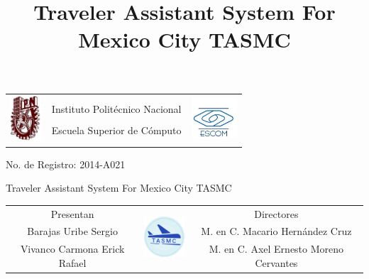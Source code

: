 \documentclass[12pt]{beamer}
\title[TASMC]{Traveler Assistant System For Mexico City TASMC}
\date{}
\begin{document}
\begin{frame}
	\begin{center}
	\begin{minipage}[t]{0.8\textwidth}	
		\begin{tabular}{ccc}
			\multirow{4}{*}{\includegraphics[height=1.7cm]{imagenes/ipn.jpg}} &
			&
     	 	\multirow{4}{*}{\includegraphics[height=1.5cm]{imagenes/escom.jpg}} \\
      		& Instituto Politécnico Nacional & \\
      		& Escuela Superior de Cómputo & \\
      		&&\\
		\end{tabular}
	\end{minipage}
	\end{center}
	
	\begin{center}
		\small No. de Registro: 2014-A021 \\
	\end{center}		
	
	\begin{center}
		\textcolor[RGB]{0,0,204}{\Large Traveler Assistant System For Mexico City TASMC}
	\end{center}		
		
	\begin{center}
	\begin{minipage}[t]{1\textwidth}	
		\begin{tabular}{ccc}
			Presentan & 
			\multirow{4}{*}{\includegraphics[height=1.7cm]{imagenes/logo.png}} & Directores \\
			\scriptsize Barajas Uribe Sergio & & \scriptsize  M. en C. Macario Hernández Cruz\\
			\scriptsize Vivanco Carmona Erick Rafael & & \scriptsize M. en C. Axel Ernesto Moreno Cervantes
		\end{tabular}
	\end{minipage}
	\end{center}
\end{frame}
\end{document}
